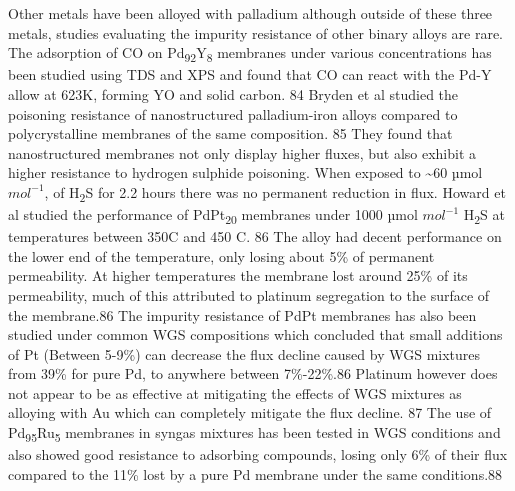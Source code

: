 Other metals have been alloyed with palladium although outside of these three metals, 
studies evaluating the impurity resistance of other binary alloys are rare. The adsorption 
of CO on Pd\textsubscript{92}Y\textsubscript{8} membranes under various concentrations has been studied using TDS and XPS 
and found that CO can react with the Pd-Y allow at 623K, forming YO and solid carbon. 84  
Bryden et al studied the poisoning resistance of nanostructured palladium-iron alloys 
compared to polycrystalline membranes of the same composition. 85 They found that 
nanostructured membranes not only display higher fluxes, but also exhibit a higher 
resistance to hydrogen sulphide poisoning. When exposed to \textasciitilde 60 µmol $mol^{-1}$, 
of H\textsubscript{2}S for 2.2 hours there was no permanent reduction in flux. 
Howard et al studied the performance of PdPt\textsubscript{20} membranes under 1000 µmol $mol^{-1}$ 
H\textsubscript{2}S at temperatures between 350\textdegree C and 450 \textdegree C. 86 
The alloy had decent performance on the lower end of the temperature, only losing about 5\% 
of permanent permeability. At higher temperatures the membrane lost around 25\% of its 
permeability, much of this attributed to platinum segregation to the surface of the 
membrane.86 The impurity resistance of PdPt membranes has also been studied under common 
WGS compositions which concluded that small additions of Pt (Between 5-9\%) can decrease 
the flux decline caused by WGS mixtures from 39\% for pure Pd, to anywhere between 7\%-22\%.86
Platinum however does not appear to be as effective at mitigating the effects of WGS mixtures 
as alloying with Au which can completely mitigate the flux decline. 87 The use of Pd\textsubscript{95}Ru\textsubscript{5} 
membranes in syngas mixtures has been tested in WGS conditions and also showed good 
resistance to adsorbing compounds, losing only 6\% of their flux compared to the 
11\% lost by a pure Pd membrane under the same conditions.88

